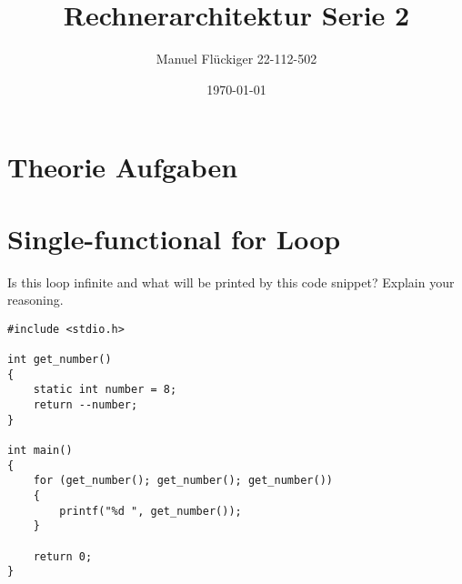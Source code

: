 \documentclass{article}
\author{Manuel Flückiger 22-112-502}
\title{Rechnerarchitektur Serie 2}
\date{\today}
\begin{document}
\newcommand{\mycomment}[1]{}

\maketitle

\section*{Theorie Aufgaben}
\section{Single-functional for Loop}
Is this loop infinite and what will be printed by this code snippet? Explain your reasoning.
\begin{verbatim}
#include <stdio.h>

int get_number()
{
    static int number = 8;
    return --number;
}

int main()
{
    for (get_number(); get_number(); get_number())
    {
        printf("%d ", get_number());
    }

    return 0;
}
\end{verbatim}
\end{document}
